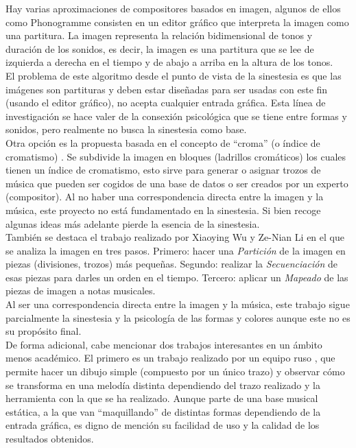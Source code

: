 Hay varias aproximaciones de compositores basados en imagen, algunos de ellos como Phonogramme \cite{ImageBaseComposition} \cite{Phonogramme} consisten en un editor gráfico que interpreta la imagen como una partitura. La imagen representa la relación bidimensional de tonos y duración de los sonidos, es decir, la imagen es una partitura que se lee de izquierda a derecha en el tiempo y de abajo a arriba en la altura de los tonos. 
\\El problema de este algoritmo desde el punto de vista de la sinestesia es que las imágenes son partituras y deben estar diseñadas para ser usadas con este fin (usando el editor gráfico), no acepta cualquier entrada gráfica. Esta línea de investigación se hace valer de la consexión psicológica que se tiene entre formas y sonidos, pero realmente no busca la sinestesia como base.\\

Otra opción es la propuesta basada en el concepto de ``croma'' (o índice de cromatismo) \cite{bricksConvertsMusic}. Se subdivide la imagen en bloques (ladrillos cromáticos) los cuales tienen un índice de cromatismo, esto sirve para generar o asignar trozos de música que pueden ser cogidos de una base de datos o ser creados por un experto (compositor). Al no haber una correspondencia directa entre la imagen y la música, este proyecto no está fundamentado en la sinestesia. Si bien recoge algunas ideas más adelante pierde la esencia de la sinestesia.\\

También se destaca el trabajo realizado por Xiaoying Wu y Ze-Nian Li \cite{ImageBaseComposition} en el que se analiza la imagen en tres pasos. Primero: hacer una \emph{Partición} de la imagen en piezas (divisiones, trozos) más pequeñas. Segundo: realizar la \emph{Secuenciación} de esas piezas para darles un orden en el tiempo. Tercero: aplicar un \emph{Mapeado} de las piezas de imagen a notas musicales.
\\Al ser una correspondencia directa entre la imagen y la música, este trabajo sigue parcialmente la sinestesia y la psicología de las formas y colores aunque este no es su propósito final.\\ 

De forma adicional, cabe mencionar dos trabajos interesantes en un ámbito menos académico.
El primero es un trabajo realizado por un equipo ruso \cite{dibujosymusica}, que permite hacer un dibujo simple (compuesto por un único trazo) y observar cómo se transforma en una melodía distinta dependiendo del trazo realizado y la herramienta con la que se ha realizado. Aunque parte de una base musical estática, a la que van ``maquillando'' de distintas formas dependiendo de la entrada gráfica, es digno de mención su facilidad de uso y la calidad de los resultados obtenidos.\\

